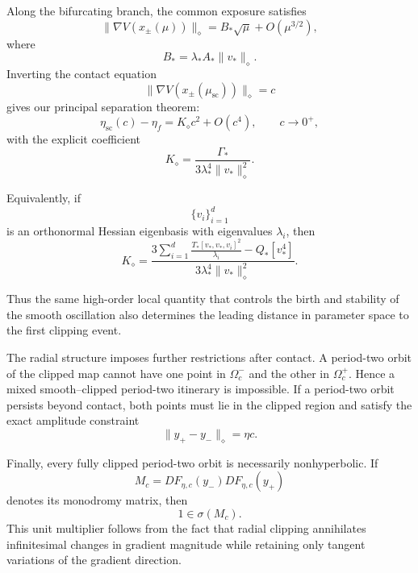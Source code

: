 Along the bifurcating branch, the common exposure satisfies
\begin{equation}
\|\nabla V(x_\pm(\mu))\|_\diamond
=
B_*\sqrt{\mu}
+
O(\mu^{3/2}),
\label{eq:intro-exposure}
\end{equation}
where
\begin{equation}
B_*
=
\lambda_*A_*
\|v_*\|_\diamond.
\label{eq:intro-B}
\end{equation}
Inverting the contact equation
\[
\|\nabla V(x_\pm(\mu_{\mathrm{sc}}))\|_\diamond=c
\]
gives our principal separation theorem:
\begin{equation}
\boxed{
\eta_{\mathrm{sc}}(c)-\eta_f
=
K_\diamond c^2
+
O(c^4),
\qquad
c\to0^+,
}
\label{eq:intro-main-law}
\end{equation}
with the explicit coefficient
\begin{equation}
\boxed{
K_\diamond
=
\frac{\Gamma_*}{
3\lambda_*^4
\|v_*\|_\diamond^2
}.
}
\label{eq:intro-K}
\end{equation}

Equivalently, if
\[
\{v_i\}_{i=1}^d
\]
is an orthonormal Hessian eigenbasis with eigenvalues
$\lambda_i$, then
\begin{equation}
K_\diamond
=
\frac{
3\displaystyle\sum_{i=1}^d
\frac{
T_*[v_*,v_*,v_i]^2
}{
\lambda_i
}
-
Q_*[v_*^4]
}{
3\lambda_*^4
\|v_*\|_\diamond^2
}.
\label{eq:intro-K-eigen}
\end{equation}

Thus the same high-order local quantity that controls the birth and
stability of the smooth oscillation also determines the leading
distance in parameter space to the first clipping event.

The radial structure imposes further restrictions after contact.
A period-two orbit of the clipped map cannot have one point in
$\Omega_c^-$ and the other in $\Omega_c^+$.  Hence a mixed
smooth--clipped period-two itinerary is impossible.  If a period-two
orbit persists beyond contact, both points must lie in the clipped
region and satisfy the exact amplitude constraint
\begin{equation}
\boxed{
\|y_+-y_-\|_\diamond
=
\eta c.
}
\label{eq:intro-clipped-amplitude}
\end{equation}

Finally, every fully clipped period-two orbit is necessarily
nonhyperbolic.  If
\[
M_c
=
DF_{\eta,c}(y_-)
DF_{\eta,c}(y_+)
\]
denotes its monodromy matrix, then
\begin{equation}
\boxed{
1\in\sigma(M_c).
}
\label{eq:intro-unit-multiplier}
\end{equation}
This unit multiplier follows from the fact that radial clipping
annihilates infinitesimal changes in gradient magnitude while
retaining only tangent variations of the gradient direction.

